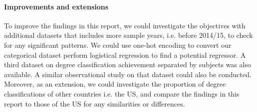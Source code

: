 \documentclass[11pt,a4paper]{article}
\begin{document}
\paragraph{Improvements and extensions}
To improve the findings in this report, we could investigate the objectives with additional datasets that includes more sample years, i.e. before 2014/15, to check for any significant patterns. We could use one-hot encoding to convert our categorical dataset perform logistical regression to find a potential regressor. A third dataset on degree classification achievement separated by subjects was also available. A similar observational study on that dataset could also be conducted. Moreover, as an extension, we could investigate the proportion of degree classifications of other countries i.e. the US, and compare the findings in this report to those of the US for any similarities or differences.



\end{document}
